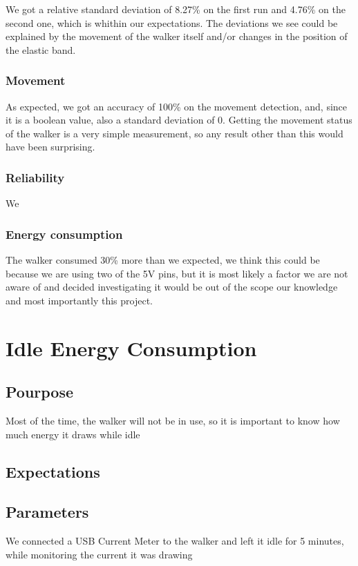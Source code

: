			We got a relative standard deviation of 8.27\% on the first run and 4.76\% on the second one, which is whithin our expectations. The deviations we see could be explained by the movement of the walker itself and/or changes in the position of the elastic band.

		\subsubsection{Movement}
			As expected, we got an accuracy of 100\% on the movement detection, and, since it is a boolean value, also a standard deviation of 0. Getting the movement status of the walker is a very simple measurement, so any result other than this would have been surprising.

		\subsubsection{Reliability}
			We 

		\subsubsection{Energy consumption}
			The walker consumed 30\% more than we expected, we think this could be because we are using two of the 5V pins, but it is most likely a factor we are not aware of and decided investigating it would be out of the scope our knowledge and most importantly this project.

\section{Idle Energy Consumption}

	\subsection{Pourpose}
		Most of the time, the walker will not be in use, so it is important to know how much energy it draws while idle
	\subsection{Expectations}

	\subsection{Parameters}
		We connected a USB Current Meter to the walker and left it idle for 5 minutes, while monitoring the current it was drawing
